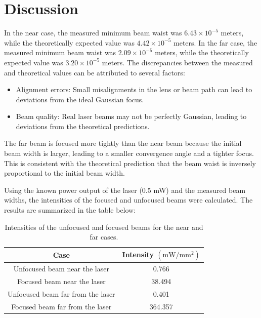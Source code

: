 \documentclass[12pt]{article}
\begin{document}
\section{Discussion}
In the near case, the measured minimum beam waist was \(6.43 \times 10^{-5}\) meters, while the theoretically expected value was \(4.42 \times 10^{-5}\) meters. In the far case, the measured minimum beam waist was \(2.09 \times 10^{-5}\) meters, while the theoretically expected value was \(3.20 \times 10^{-5}\) meters. The discrepancies between the measured and theoretical values can be attributed to several factors:
\begin{itemize}
    \item Alignment errors: Small misalignments in the lens or beam path can lead to deviations from the ideal Gaussian focus.
    \item Beam quality: Real laser beams may not be perfectly Gaussian, leading to deviations from the theoretical predictions.
\end{itemize}

The far beam is focused more tightly than the near beam because the initial beam width is larger, leading to a smaller convergence angle and a tighter focus. This is consistent with the theoretical prediction that the beam waist is inversely proportional to the initial beam width.

Using the known power output of the laser (0.5 mW) and the measured beam widths, the intensities of the focused and unfocused beams were calculated. The results are summarized in the table below:

\begin{table}[H]
    \centering
    \begin{tabular}{|c|c|}
        \hline
        \textbf{Case} & \textbf{Intensity $(\text{mW}/\text{mm}^2)$} \\
        \hline
        Unfocused beam near the laser & 0.766 \\
        Focused beam near the laser & 38.494 \\
        Unfocused beam far from the laser & 0.401 \\
        Focused beam far from the laser & 364.357 \\
        \hline
    \end{tabular}
    \caption{Intensities of the unfocused and focused beams for the near and far cases.}
    \label{tab:intensities}
\end{table}
\end{document}
